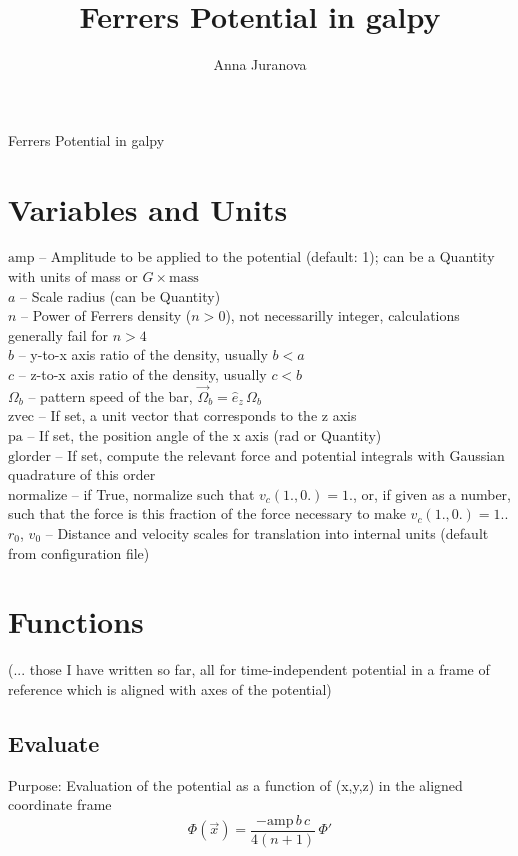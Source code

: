 \documentclass[a4paper,11pt]{article}
\author{Anna Juranova}
\title{Ferrers Potential in galpy}
\begin{document}
	
	\begin{center}
		\huge{Ferrers Potential in galpy}\\
	\end{center}

	\section{Variables and Units}
           $ \mathrm{amp} $ -- Amplitude to be applied to the potential (default: 1); can be a Quantity with units of mass or $ G \times \mathrm{mass} $\\
           $ a $ -- Scale radius (can be Quantity)\\
           $ n $ -- Power of Ferrers density ($ n > 0 $), not necessarilly integer, calculations generally fail for $ n > 4 $\\
           $ b $ -- y-to-x axis ratio of the density, usually $ b < a $\\
           $ c $ -- z-to-x axis ratio of the density, usually $ c < b $\\
           $ \Omega_b $ -- pattern speed of the bar, $ \vec{\Omega}_b = \hat{e}_z\,\Omega_b $\\
           $ \mathrm{zvec} $ -- If set, a unit vector that corresponds to the z axis\\
           $ \mathrm{pa} $ -- If set, the position angle of the x axis (rad or Quantity)\\
           $ \mathrm{glorder} $ -- If set, compute the relevant force and potential integrals with Gaussian quadrature of this order\\
           normalize -- if True, normalize such that $ v_c(1.,0.)=1. $, or, if given as a number, such that the force is this fraction of the force necessary to make $ v_c(1.,0.)=1. $.\\
           $ r_0 $, $ v_0 $ -- Distance and velocity scales for translation into internal units (default from configuration file)\\
	

	\section{Functions}
	(... those I have written so far, all for time-independent potential in a frame of reference which is aligned with axes of the potential)
		 
		\subsection{Evaluate} %
			Purpose: Evaluation of the potential as a function of (x,y,z) in the aligned coordinate frame \\
   		\begin{equation}
   		\Phi(\vec{x}) = \frac{-\mathrm{amp}\,b\,c}{4(n+1)}\,\Phi'
   		\end{equation}	
	   		
	
\end{document}
